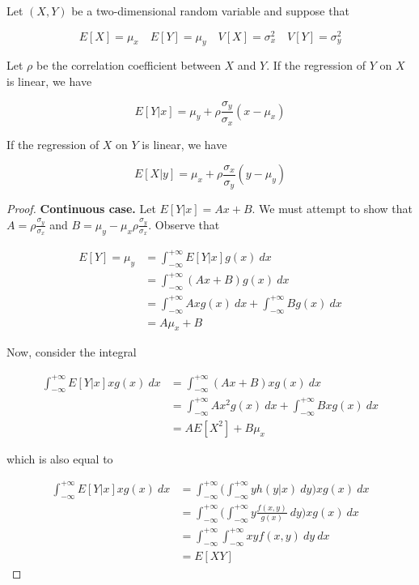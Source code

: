 \documentclass[10pt, oneside]{article}
\begin{document}
\begin{enumerate}[label=7.\arabic*]
  \begin{thm*}
  Let $(X,Y)$ be a two-dimensional random variable and suppose that
  
  \[ E[X] = \mu_x \quad E[Y] = \mu_y \quad V[X] = \sigma^2_x \quad V[Y] = \sigma^2_y \]
  
  Let $\rho$ be the correlation coefficient between $X$ and $Y$. If the regression of $Y$ on $X$ is linear, we have
  
  \[ E[Y | x] = \mu_y + \rho \frac{\sigma_y}{\sigma_x} (x - \mu_x) \]
  
  If the regression of $X$ on $Y$ is linear, we have
  
  \[ E[X | y] = \mu_x + \rho \frac{\sigma_x}{\sigma_y} (y - \mu_y) \]
    
  \end{thm*}
  
  \begin{proof}
  \textbf{Continuous case.} Let $E[Y | x] = Ax + B$. We must attempt to show that $A = \rho \frac{\sigma_y}{\sigma_x}$ and $B = \mu_y -\mu_x \rho \frac{\sigma_y}{\sigma_x}$. Observe that
  
  \begin{align*}
  E[Y] = \mu_y &= \int^{+\infty}_{-\infty} E[Y | x] g(x) \ dx \\
  &= \int^{+\infty}_{-\infty} (Ax + B) g(x) \ dx \\
  &= \int^{+\infty}_{-\infty} Ax g(x) \ dx + \int^{+\infty}_{-\infty} B g(x) \ dx \\
  &= A \mu_x + B
  \end{align*}
  
  Now, consider the integral
  
  \begin{align*}
  \int^{+\infty}_{-\infty} E[Y | x] x g(x) \ dx &= \int^{+\infty}_{-\infty} (Ax + B) x g(x) \ dx \\
  &= \int^{+\infty}_{-\infty} Ax^2 g(x) \ dx + \int^{+\infty}_{-\infty} B x g(x) \ dx \\
  &= A E[X^2] + B \mu_x
  \end{align*}
  
  which is also equal to
  
  \begin{align*}
  \int^{+\infty}_{-\infty} E[Y | x] x g(x) \ dx &= \int^{+\infty}_{-\infty} \Bigg( \int^{+\infty}_{-\infty} y h(y | x) \ dy \Bigg) x g(x) \ dx \\
  &= \int^{+\infty}_{-\infty} \Bigg( \int^{+\infty}_{-\infty} y \frac{f(x,y)}{g(x)} \ dy \Bigg) x g(x) \ dx \\
  &= \int^{+\infty}_{-\infty} \int^{+\infty}_{-\infty} xy f(x,y) \ dy \ dx \\
  &= E[XY]
  \end{align*}
  

\end{proof}
\end{enumerate}
\end{document}
